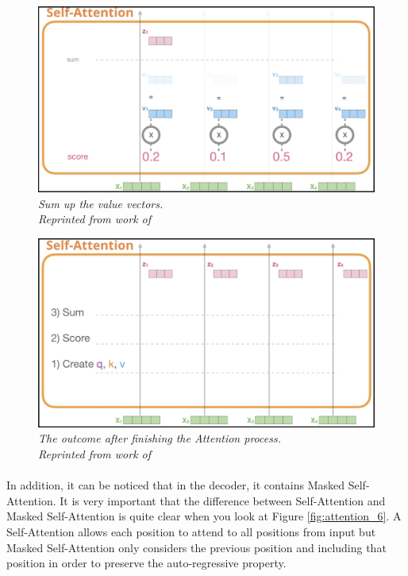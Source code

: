 \begin{figure}[H]
  \centering
  \caption[Sum up the value vectors.]{\emph{Sum up the value vectors. \\
  Reprinted from work of \citeauthor{alammar_2018} \citeyear{alammar_2018}}}\label{fig:attention_4}
  \includegraphics[scale = 0.3]{figures/attention_4.jpg}  
\end{figure}
\begin{figure}[H]
  \centering
  \caption[The outcome after finishing the Attention process.]{\emph{The outcome after finishing the Attention process. \\Reprinted from work of \citeauthor{alammar_2018} \citeyear{alammar_2018}}}\label{fig:attention_5}
  \includegraphics[scale = 0.3]{figures/attention_5.jpg}  
\end{figure}

\paragraph{}
In addition, it can be noticed that in the decoder, it contains Masked Self-Attention. It is very important that the difference between Self-Attention and Masked Self-Attention is quite clear when you look at Figure \ref{fig:attention_6}. A Self-Attention allows each position to attend to all positions from input but Masked Self-Attention only considers the previous position and including that position in order to preserve the auto-regressive property.


